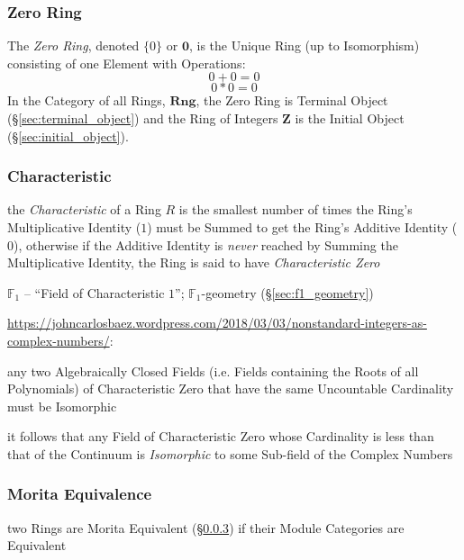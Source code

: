 \subsubsection{Zero Ring}\label{sec:zero_ring}

The \emph{Zero Ring}, denoted $\{0\}$ or $\mathbf{0}$, is the Unique Ring
(up to Isomorphism) consisting of one Element with Operations:
\[
    0 + 0 = 0
\] \[
    0 * 0 = 0
\]
In the Category of all Rings, $\mathbf{Rng}$, the Zero Ring is
Terminal Object (\S\ref{sec:terminal_object}) and the Ring of Integers
$\mathbf{Z}$ is the Initial Object (\S\ref{sec:initial_object}).



\subsubsection{Characteristic}\label{sec:ring_characteristic}

the \emph{Characteristic} of a Ring $R$ is the smallest number of times the
Ring's Multiplicative Identity ($1$) must be Summed to get the Ring's Additive
Identity ($0$), otherwise if the Additive Identity is \emph{never} reached by
Summing the Multiplicative Identity, the Ring is said to have
\emph{Characteristic Zero}

\fist $\mathbb{F}_1$ -- ``Field of Characteristic $1$''; $\mathbb{F}_1$-geometry
(\S\ref{sec:f1_geometry})

\url{https://johncarlosbaez.wordpress.com/2018/03/03/nonstandard-integers-as-complex-numbers/}:

any two Algebraically Closed Fields (i.e. Fields containing the Roots of all
Polynomials) of Characteristic Zero that have the same Uncountable Cardinality
must be Isomorphic

it follows that any Field of Characteristic Zero whose Cardinality is less than
that of the Continuum is \emph{Isomorphic} to some Sub-field of the Complex
Numbers



\subsubsection{Morita Equivalence}\label{sec:morita_equivalence}

two Rings are Morita Equivalent (\S\ref{sec:morita_equivalence}) if their
Module Categories are Equivalent



